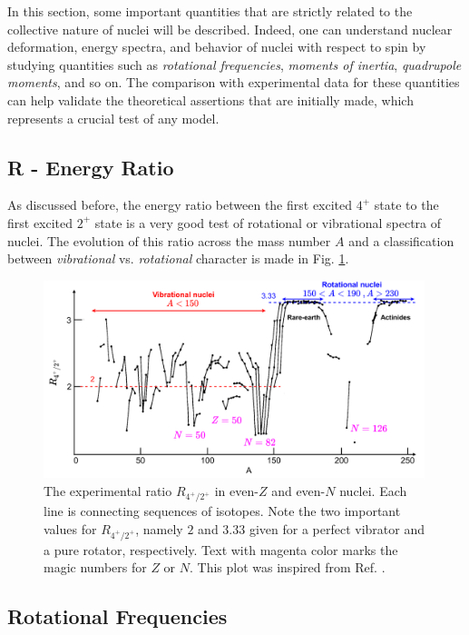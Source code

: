 In this section, some important quantities that are strictly related to the collective nature of nuclei will be described. Indeed, one can understand nuclear deformation, energy spectra, and behavior of nuclei with respect to spin by studying quantities such as \emph{rotational frequencies}, \emph{moments of inertia}, \emph{quadrupole moments}, and so on. The comparison with experimental data for these quantities can help validate the theoretical assertions that are initially made, which represents a crucial test of any model.

\subsection{R - Energy Ratio}

As discussed before, the energy ratio between the first excited $4^+$ state to the first excited $2^+$ state is a very good test of rotational or vibrational spectra of nuclei. The evolution of this ratio across the mass number $A$ and a classification between \emph{vibrational} vs. \emph{rotational} character is made in Fig. \ref{4state-2state-ratio}.
\begin{figure}
    \centering
    \includegraphics[width=0.99\textwidth]{Chapters/Figures/vibrations_rotations_E42-ratio.pdf}
    \caption{The experimental ratio $R_{4^+/2^+}$ in even-$Z$ and even-$N$ nuclei. Each line is connecting sequences of isotopes. Note the two important values for $R_{4^+/2^+}$, namely $2$ and $3.33$ given for a perfect vibrator and a pure rotator, respectively. Text with magenta color marks the magic numbers for $Z$ or $N$. This plot was inspired from Ref. \cite{casten2000nuclear}.}
    \label{4state-2state-ratio}
\end{figure}

\subsection{Rotational Frequencies}

